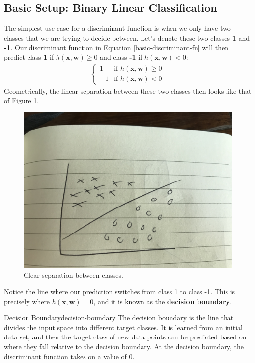 \subsection{Basic Setup: Binary Linear Classification}
The simplest use case for a discriminant function is when we only have two classes that we are trying to decide between. Let's denote these two classes \textbf{1} and \textbf{-1}. Our discriminant function in Equation \ref{basic-discriminant-fn} will then predict class \textbf{1} if $h(\textbf{x}, \textbf{w}) \geq 0$ and class \textbf{-1} if $h(\textbf{x}, \textbf{w}) < 0$:
\begin{align*}
	\begin{cases} 
    	1 & \text{if } h(\textbf{x}, \textbf{w}) \geq 0 \\
    	-1 & \text{if } h(\textbf{x}, \textbf{w}) < 0
   \end{cases}
\end{align*}
Geometrically, the linear separation between these two classes then looks like that of Figure \ref{fig:lin-sep-bn-classes}.
\begin{figure}
    \centering
    \includegraphics[width=0.5\paperwidth]{../Classification/fig/lin_sep_bn_classes.jpg}
    \caption{Clear separation between classes.}
    \label{fig:lin-sep-bn-classes}
\end{figure}
Notice the line where our prediction switches from class 1 to class -1. This is precisely where $h(\textbf{x}, \textbf{w}) = 0$, and it is known as the \textbf{decision boundary}.

\begin{definition}{Decision Boundary}{decision-boundary}
	The decision boundary is the line that divides the input space into different target classes. It is learned from an initial data set, and then the target class of new data points can be predicted based on where they fall relative to the decision boundary. At the decision boundary, the discriminant function takes on a value of 0.
\end{definition}


